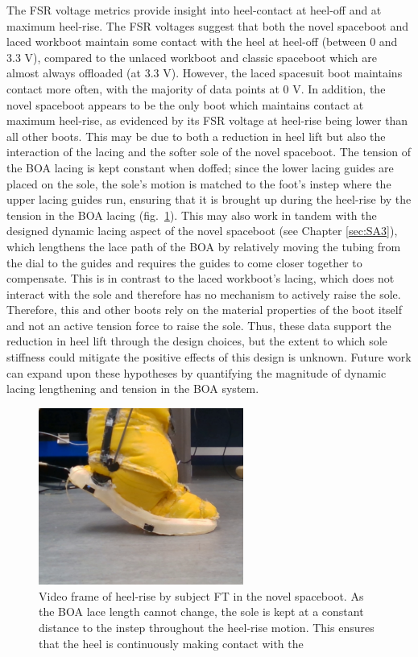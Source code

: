 \documentclass[defaultstyle,11pt]{thesis}
\begin{document}
The FSR voltage metrics provide insight into heel-contact at heel-off and at maximum heel-rise.
The FSR voltages suggest that both the novel spaceboot and laced workboot maintain some contact with the heel at heel-off (between 0 and 3.3 V), compared to the unlaced workboot and classic spaceboot which are almost always offloaded (at 3.3 V).
However, the laced spacesuit boot maintains contact more often, with the majority of data points at 0 V.
In addition, the novel spaceboot appears to be the only boot which maintains contact at maximum heel-rise, as evidenced by its FSR voltage at heel-rise being lower than all other boots.
This may be due to both a reduction in heel lift but also the interaction of the lacing and the softer sole of the novel spaceboot.
The tension of the BOA lacing is kept constant when doffed; since the lower lacing guides are placed on the sole, the sole's motion is matched to the foot's instep where the upper lacing guides run, ensuring that it is brought up during the heel-rise by the tension in the BOA lacing (fig.~\ref{fig:SA4-heelliftcap}).
This may also work in tandem with the designed dynamic lacing aspect of the novel spaceboot (see Chapter \ref{sec:SA3}), which lengthens the lace path of the BOA by relatively moving the tubing from the dial to the guides and requires the guides to come closer together to compensate.
This is in contrast to the laced workboot's lacing, which does not interact with the sole and therefore has no mechanism to actively raise the sole.
Therefore, this and other boots rely on the material properties of the boot itself and not an active tension force to raise the sole.
Thus, these data support the reduction in heel lift through the design choices, but the extent to which sole stiffness could mitigate the positive effects of this design is unknown.
Future work can expand upon these hypotheses by quantifying the magnitude of dynamic lacing lengthening and tension in the BOA system.

\hypertarget{fig:SA4-heelliftcap}{%
\begin{figure}
\centering
\includegraphics[width=0.6\textwidth,height=\textheight]{../fig/sa4/HeelLift_ScreenCap.png}
\caption[{Heel-rise in novel spaceboot}]{Video frame of heel-rise by subject FT in the novel spaceboot. As the BOA lace length cannot change, the sole is kept at a constant distance to the instep throughout the heel-rise motion. This ensures that the heel is continuously making contact with the}
\label{fig:SA4-heelliftcap}
\end{figure}
}
\end{document}
